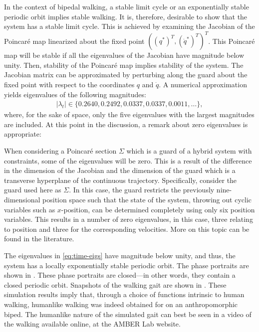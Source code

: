 In the context of bipedal walking, a stable limit cycle or an exponentially stable periodic orbit implies stable walking. It is, therefore, desirable to show that the system has a stable limit cycle. This is achieved by examining the Jacobian of the Poincar{\'e} map linearized about the fixed point $((q^*)^T, ({\dot q}^*)^T)^T$.\cite{PC89}\xspace This Poincar{\'e} map will be stable if all the eigenvalues of the Jacobian have magnitude below unity. Then, stability of the Poincar{\'e} map implies stability of the system. The Jacobian matrix can be approximated by perturbing along the guard about the fixed point with respect to the coordinates $q$ and ${\dot q}$. A numerical approximation yields eigenvalues of the following magnitudes:
\begin{align}
  \label{eq:time-eigs}
  |\lambda_t| \in \{0.2640, 0.2492, 0.0337, 0.0337, 0.0011, \ldots\},
\end{align}
where, for the sake of space, only the five eigenvalues with the largest magnitudes are included. At this point in the discussion, a remark about zero eigenvalues is appropriate:

%

\begin{remark}
  When considering a Poincar{\'e} section $\Sigma$ which is a guard of a hybrid system with constraints, some of the eigenvalues will be zero. This is a result of the difference in the dimension of the Jacobian and the dimension of the guard which is a transverse hyperplane of the continuous trajectory. Specifically, consider the guard used here as $\Sigma$. In this case, the guard restricts the previously nine-dimensional position space such that the state of the system, throwing out cyclic variables such as $x$-position, can be determined completely using only six position variables. This results in a number of zero eigenvalues, in this case, three relating to position and three for the corresponding velocities. More on this topic can be found in the literature.\cite{WA10}
\end{remark}

The eigenvalues in \eqref{eq:time-eigs} have magnitude below unity, and thus, the system has a locally exponentially stable periodic orbit. The phase portraits are shown in . These phase portraits are closed---in other words, they contain a closed periodic orbit. Snapshots of the walking gait are shown in . These simulation results imply that, through a choice of functions intrinsic to human walking, humanlike walking was indeed obtained for on an anthropomorphic biped. The humanlike nature of the simulated gait can best be seen in a video of the walking available online, at the AMBER Lab website.\cite{url:bipedalrobotics}

